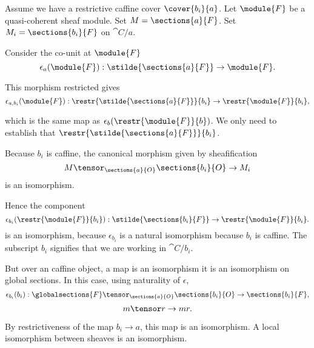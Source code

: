 Assume we have a restrictive caffine cover $\cover{b_i}{a}$. 
Let $\module{F}$ be a quasi-coherent sheaf module. 
Set $M = \sections{a}{F}$.
Set $M_i = \sections{b_i}{F}$ on $\cat{C}/a$.

Consider the co-unit at $\module{F}$
\[\epsilon_a(\module{F}): \stilde{\sections{a}{F}} \rightarrow \module{F}.\]

This morphism restricted gives
\[\epsilon_{a,b_i}(\module{F}): \restr{\stilde{\sections{a}{F}}}{b_i} \rightarrow \restr{\module{F}}{b_i},\]

which is the same map as $\epsilon_{b}(\restr{\module{F}}{b})$.
We only need to establish that $\restr{\stilde{\sections{a}{F}}}{b_i}$.

Because $b_i$ is caffine, the canonical morphism given by sheafification
\[ M \tensor_{\sections{a}{O}} \sections{b_i}{O} \rightarrow  M_i\] is an isomorphism.

Hence the component 
\[\epsilon_{b_i}(\restr{\module{F}}{b_i}): \stilde{\sections{b_i}{F}} \rightarrow \restr{\module{F}}{b_i}.\]
is an isomorphism, because $\epsilon_{b_i}$ is a natural isomorphism because $b_i$ is caffine.
The subscript ${b_i}$ signifies that we are working in $\cat{C}/b_i$.

But over an caffine object, a map is an isomorphism \iff it is an isomorphism on global sections. 
In this case, using naturality of $\epsilon$,
\[\epsilon_{b_i}(b_i): \globalsections{F} \tensor_{\sections{a}{O}} \sections{b_i}{O} \rightarrow \sections{b_i}{F},\]
\[ m \tensor r \rightarrow mr.\]

By restrictiveness of the map $b_i\rightarrow a$, this map is an isomorphism. A local isomorphism between sheaves is an isomorphism.




